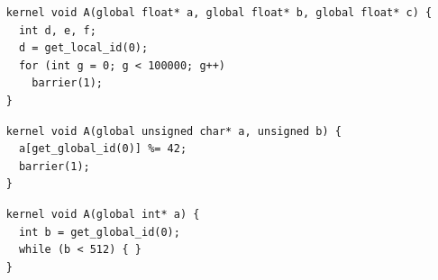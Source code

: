 
\newsavebox{\NvidiaOptLoopHang}
\begin{lrbox}{\NvidiaOptLoopHang}
  \hspace{1.5em}
  \begin{lstlisting}
    kernel void A(global float* a, global float* b, global float* c) {
      int d, e, f;
      d = get_local_id(0);
      for (int g = 0; g < 100000; g++)
        barrier(1);
    }
  \end{lstlisting}
\end{lrbox}

\newsavebox{\XeonPhiSpin}
\begin{lrbox}{\XeonPhiSpin}
  \hspace{1.5em}
  \begin{lstlisting}
    kernel void A(global unsigned char* a, unsigned b) {
      a[get_global_id(0)] %= 42;
      barrier(1);
    }
  \end{lstlisting}
\end{lrbox}

\newsavebox{\IntelOptLoopHang}
\begin{lrbox}{\IntelOptLoopHang}
  \hspace{1.5em}
  \begin{lstlisting}
    kernel void A(global int* a) {
      int b = get_global_id(0);
      while (b < 512) { }
    }
  \end{lstlisting}
\end{lrbox}


